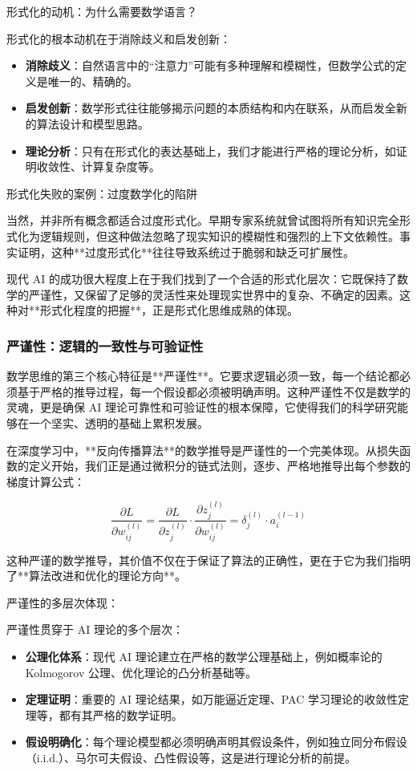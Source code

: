 形式化的动机：为什么需要数学语言？

形式化的根本动机在于消除歧义和启发创新：

\begin{itemize}
\item \textbf{消除歧义}：自然语言中的“注意力”可能有多种理解和模糊性，但数学公式的定义是唯一的、精确的。
\item \textbf{启发创新}：数学形式往往能够揭示问题的本质结构和内在联系，从而启发全新的算法设计和模型思路。
\item \textbf{理论分析}：只有在形式化的表达基础上，我们才能进行严格的理论分析，如证明收敛性、计算复杂度等。
\end{itemize}

形式化失败的案例：过度数学化的陷阱

当然，并非所有概念都适合过度形式化。早期专家系统就曾试图将所有知识完全形式化为逻辑规则，但这种做法忽略了现实知识的模糊性和强烈的上下文依赖性。事实证明，这种**过度形式化**往往导致系统过于脆弱和缺乏可扩展性。

现代 AI 的成功很大程度上在于我们找到了一个合适的形式化层次：它既保持了数学的严谨性，又保留了足够的灵活性来处理现实世界中的复杂、不确定的因素。这种对**形式化程度的把握**，正是形式化思维成熟的体现。

\subsubsection{严谨性：逻辑的一致性与可验证性}

数学思维的第三个核心特征是**严谨性**。它要求逻辑必须一致，每一个结论都必须基于严格的推导过程，每一个假设都必须被明确声明。这种严谨性不仅是数学的灵魂，更是确保 AI 理论可靠性和可验证性的根本保障，它使得我们的科学研究能够在一个坚实、透明的基础上累积发展。

在深度学习中，**反向传播算法**的数学推导是严谨性的一个完美体现。从损失函数的定义开始，我们正是通过微积分的链式法则，逐步、严格地推导出每个参数的梯度计算公式：

$$\frac{\partial L}{\partial w_{ij}^{(l)}} = \frac{\partial L}{\partial z_j^{(l)}} \cdot \frac{\partial z_j^{(l)}}{\partial w_{ij}^{(l)}} = \delta_j^{(l)} \cdot a_i^{(l-1)}$$

这种严谨的数学推导，其价值不仅在于保证了算法的正确性，更在于它为我们指明了**算法改进和优化的理论方向**。

严谨性的多层次体现：

严谨性贯穿于 AI 理论的多个层次：

\begin{itemize}
\item \textbf{公理化体系}：现代 AI 理论建立在严格的数学公理基础上，例如概率论的 Kolmogorov 公理、优化理论的凸分析基础等。
\item \textbf{定理证明}：重要的 AI 理论结果，如万能逼近定理、PAC 学习理论的收敛性定理等，都有其严格的数学证明。
\item \textbf{假设明确化}：每个理论模型都必须明确声明其假设条件，例如独立同分布假设（i.i.d.）、马尔可夫假设、凸性假设等，这是进行理论分析的前提。
\end{itemize}

